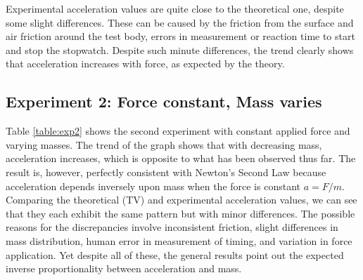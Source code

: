 \documentclass[a4paper,12pt]{article}
\begin{document}
Experimental acceleration values are quite close to the theoretical one, despite some slight differences. These can be caused by the friction from the surface and air friction around the test body, errors in measurement or reaction time to start and stop the stopwatch. Despite such minute differences, the trend clearly shows that acceleration increases with force, as expected by the theory.

\subsection{Experiment 2: Force constant, Mass varies}
\begin{table}[h]
    \centering
    \renewcommand{\arraystretch}{1.2}
    \caption{Results for Experiment 2: Force constant, Mass varies}
    \label{table:exp2}
\end{table}


Table \ref{table:exp2} shows the second experiment with constant applied force and varying masses. The trend of the graph shows that with decreasing mass, acceleration increases, which is opposite to what has been observed thus far. The result is, however, perfectly consistent with Newton's Second Law because acceleration depends inversely upon mass when the force is constant \( a = F/m \). \\

Comparing the theoretical (TV) and experimental acceleration values, we can see that they each exhibit the same pattern but with minor differences. The possible reasons for the discrepancies involve inconsistent friction, slight differences in mass distribution, human error in measurement of timing, and variation in force application. Yet despite all of these, the general results point out the expected inverse proportionality between acceleration and mass.
\end{document}

